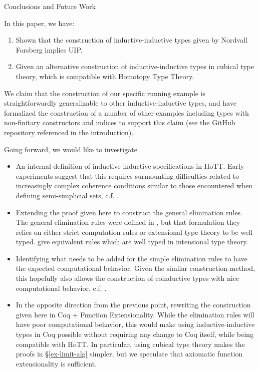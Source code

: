 \documentclass[runningheads]{llncs}
\def\Forsberg/{Nordvall Forsberg}
\begin{document}
\begin{section}{Conclusions and Future Work}

In this paper, we have:
\begin{enumerate}
    \item Shown that the construction of inductive-inductive types given by \Forsberg/ implies UIP.
    \item Given an alternative construction of inductive-inductive types in cubical type theory, which is compatible with Homotopy Type Theory.
\end{enumerate}

We claim that the construction of our specific running example is straightforwardly generalizable to other inductive-inductive types, and have formalized the construction of a number of other examples including types with non-finitary constructors and indices to support this claim (see the GitHub repository referenced in the introduction).

Going forward, we would like to investigate
\begin{itemize}
    \item An internal definition of inductive-inductive specifications in HoTT. Early experiments suggest that this requires surmounting difficulties related to increasingly complex coherence conditions similar to those encountered when defining semi-simplicial sets, c.f. \citet{simplicialsets}.
    \item Extending the proof given here to construct the general elimination rules. The general elimination rules were defined in \citet{nordvallforsberg2013thesis}, but that formulation they relies on either strict computation rules or extensional type theory to be well typed. \citet{KaposiKovacsHIITsyntax} give equivalent rules which are well typed in intensional type theory.
    \item Identifying what needs to be added for the simple elimination rules to have the expected computational behavior. Given the similar construction method, this hopefully also allows the construction of coinductive types with nice computational behavior, c.f. \citet{nonwellfoundedtrees}.
    \item In the opposite direction from the previous point, rewriting the construction given here in Coq + Function Extensionality. While the elimination rules will have poor computational behavior, this would make using inductive-inductive types in Coq possible without requiring any change to Coq itself, while being compatible with HoTT. In particular, using cubical type theory makes the proofs in \S\ref{ex-limit-alg} simpler, but we speculate that axiomatic function extensionality is sufficient.
\end{itemize}

\end{section}
\end{document}
